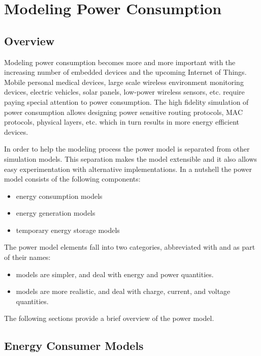 \chapter{Modeling Power Consumption}
\label{cha:power}

\section{Overview}

Modeling power consumption becomes more and more important with the increasing
number of embedded devices and the upcoming Internet of Things. Mobile personal
medical devices, large scale wireless environment monitoring devices, electric
vehicles, solar panels, low-power wireless sensors, etc. require paying special
attention to power consumption. The high fidelity simulation of power
consumption allows designing power sensitive routing protocols, MAC protocols,
physical layers, etc. which in turn results in more energy efficient devices.

In order to help the modeling process the power model is separated from other
simulation models. This separation makes the model extensible and it also allows
easy experimentation with alternative implementations. In a nutshell the power
model consists of the following components:

\begin{itemize}
  \item energy consumption models
  \item energy generation models
  \item temporary energy storage models
\end{itemize}

The power model elements fall into two categories, abbreviated with 
and  as part of their names: 

\begin{itemize}
  \item {} models are simpler, and deal with energy and power quantities.
  \item {} models are more realistic, and deal with charge, current, and voltage quantities.
\end{itemize}

The following sections provide a brief overview of the power model.

\section{Energy Consumer Models}

